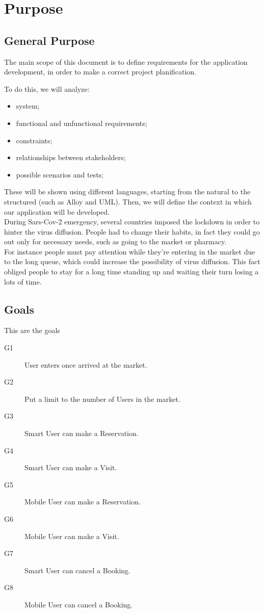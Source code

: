\section{Purpose}
\subsection{General Purpose}

The main scope of this document is to define requirements for the application development, in order to make a correct project planification.
\par
To do this, we will analyze:

\begin{itemize}
\item system;
\item functional and unfunctional requirements;
\item constraints;
\item relationships between stakeholders;
\item possible scenarios and tests;
\end{itemize}
\bigskip
These will be shown using different languages, starting from the natural to the structured (such as Alloy and UML).
Then, we will define the context in which our application will be developed.\\
During Sars-Cov-2 emergency, several countries imposed the lockdown in order to hinter the virus diffusion.
People had to change their habits, in fact they could go out only for necessary needs, such as going to the market or pharmacy.\\
For instance people must pay attention while they're entering in the market due to the long queue, which could increase the possibility of virus diffusion.
This fact obliged people to stay for a long time standing up and waiting their turn losing a lots of time. 
\pagebreak

\subsection{Goals}

This are the goals 

\begin{description}
    \item[G1]User enters once arrived at the market.
    \item[G2]Put a limit to the number of Users in the market.
    \item[G3]Smart User can make a Reservation.
    \item[G4]Smart User can make a Visit.
    \item[G5]Mobile User can make a Reservation.
    \item[G6]Mobile User can make a Visit.
    \item[G7]Smart User can cancel a Booking.
    \item[G8]Mobile User can cancel a Booking.
\end{description}



